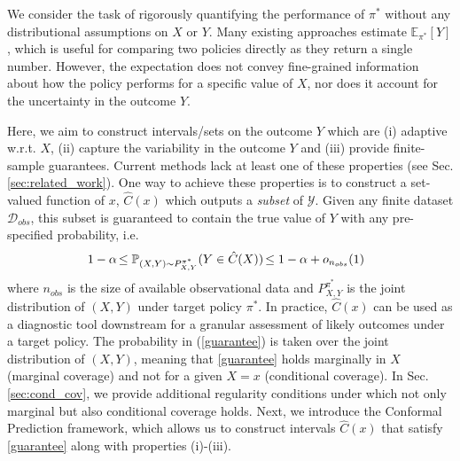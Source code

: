 
We consider the task of rigorously quantifying the performance of $\pi^*$ without any distributional assumptions on $X$ or $Y$. Many existing approaches estimate $\mathbb{E}_{\pi^*}[Y]$, which is useful for comparing two policies directly as they return a single number. However, the expectation does not convey fine-grained information about how the policy performs for a specific value of $X$, nor does it account for the uncertainty in the outcome $Y$.

Here, we aim to construct intervals/sets on the outcome $Y$ which are (i) adaptive w.r.t. $X$, (ii) capture the variability in the outcome $Y$ and (iii) provide finite-sample guarantees. Current methods lack at least one of these properties (see Sec. \ref{sec:related_work}). One way to achieve these properties is to construct a set-valued function of $x$, $\hat{C}(x)$ which outputs a \emph{subset} of $\mathcal{Y}$. Given any finite dataset $\mathcal{D}_{obs}$, this subset is guaranteed to contain the true value of $Y$ with any pre-specified probability, i.e.
\begin{align}
     \hspace{-0.24cm}1- \alpha \hspace{-0.05cm}\leq  \tarprob(Y \in \hat{C}(X)) \hspace{-0.05cm}\leq 1- \alpha + o_{n_{obs}}(1) \label{guarantee}
\end{align}
where $n_{obs}$ is the size of available observational data and $P^{\pi^*}_{X,Y}$ is the joint distribution of $(X,Y)$ under target policy $\pi^*$. In practice, $\hat{C}(x)$ can be used as a diagnostic tool downstream for a granular assessment of likely outcomes under a target policy. The probability in (\ref{guarantee}) is taken over the joint distribution of $(X, Y)$, meaning that \eqref{guarantee} holds marginally in $X$ (marginal coverage) and not for a given $X=x$ (conditional coverage). In Sec. \ref{sec:cond_cov}, we provide additional regularity conditions under which not only marginal but also conditional coverage holds. Next, we introduce the Conformal Prediction framework, which allows us to construct intervals $\hat{C}(x)$ that satisfy \eqref{guarantee} along with properties (i)-(iii). 

